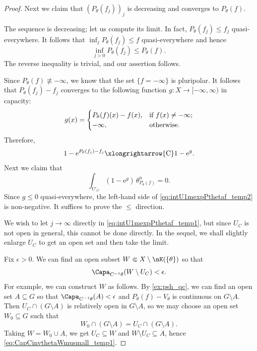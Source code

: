 \begin{proof}
    Next we claim that $(P_{\theta}(f_j))_j$ is decreasing and converges to $P_{\theta}(f)$.

    The sequence is decreasing; let us compute its limit.
    In fact, $P_{\theta}(f_j)\leq f_j$ quasi-everywhere. It follows that $\inf_j P_{\theta}(f_j)\leq f$ quasi-everywhere and hence
    \[
    \inf_{j>0} P_{\theta}(f_j)\leq P_{\theta}(f).
    \]
    The reverse inequality is trivial, and our assertion follows.

    Since $P_{\theta}(f)\not\equiv -\infty$, we know that the set $\{f=-\infty\}$ is pluripolar. It follows that $P_{\theta}(f_j)-f_j$ converges to the following function $g\colon X\rightarrow [-\infty,\infty)$ in capacity:
    \[
    g(x)=\begin{cases}
        P_{\theta}(f)(x)-f(x),&\textup{if } f(x)\neq -\infty;\\
        -\infty,& \textup{otherwise}.
    \end{cases}
    \]
    Therefore,
    \[
    1-\mathrm{e}^{P_{\theta}(f_j)-f_j}\xlongrightarrow{\mathrm{C}} 1-\mathrm{e}^{g}.
    \]
    Next we claim that
     \begin{equation}\label{eq:intU1mexpPthetaf_temp2}
    \int_{U'_C} \left( 1-\mathrm{e}^{g} \right)\,\theta_{P_{\theta}(f)}^n=0.
    \end{equation}
    Since $g\leq 0$ quasi-everywhere, the left-hand side of \eqref{eq:intU1mexpPthetaf_temp2} is non-negative. It suffices to prove the $\leq$ direction.

    We wish to let $j\to\infty$ directly in \eqref{eq:intU1mexpPthetaf_temp1}, but since $U_C$ is not open in general, this cannot be done directly. In the sequel, we shall slightly enlarge $U_C$ to get an open set and then take the limit.

    Fix $\epsilon>0$. We can find an open subset $W\Subset X\setminus \nK(\{\theta\})$ so that
    \begin{equation}\label{eq:CapCinvthetaWmusmall_temp1}
    \Capa_{C^{-1}\theta}(W\setminus U_C)<\epsilon.
    \end{equation}
    For example, we can construct $W$ as follows. By \cref{ex:psh_qc}, we can find an open set $A\subseteq G$ so that $\Capa_{C^{-1}\theta}(A)<\epsilon$ and $P_{\theta}(f)-V_{\theta}$ is continuous on $G\setminus A$. Then $U_C\cap (G\setminus A)$ is relatively open in $G\setminus A$, so we may choose an open set $W_0\subseteq G$ such that
    \[
        W_0\cap (G\setminus A)=U_C\cap (G\setminus A).
    \]
    Taking $W=W_0\cup A$, we get $U_C\subseteq W$ and $W\setminus U_C\subseteq A$, hence \eqref{eq:CapCinvthetaWmusmall_temp1}.


\end{proof}
